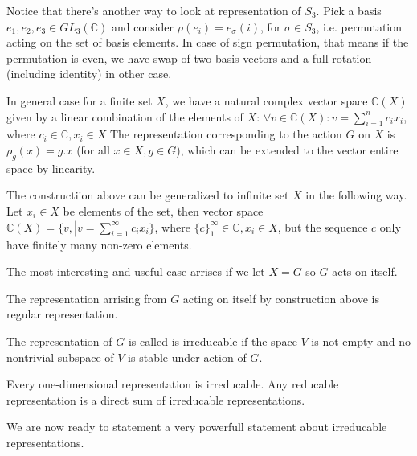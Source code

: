 \documentclass{amsart}
\begin{document}
Notice that there's another way to look at representation of $S_3$. Pick a basis $e_1, e_2, e_3 \in GL_3 (\mathbb C)$ and consider $\rho (e_i) = e_\sigma(i)$, for $\sigma \in S_3$, i.e. permutation acting on the set of basis elements. In case of sign permutation, that means 
if the permutation is even, we have swap of two basis vectors and a full rotation (including identity) in other case.

In general case for a finite set $X$, we have a natural complex vector space $\mathbb{C}(X)$ given by a linear combination of the elements of $X$:
$\forall v \in \mathbb{C}(X): v = \sum_{i=1}^n c_i x_i$, where $c_i \in \mathbb{C}, x_i \in X$
The representation corresponding to the action $G$ on $X$ is $\rho_g (x) = g . x$ (for all $x\in X, g \in G$), which can be extended to the vector entire space by linearity.

\begin{note}
    The constructiion above can be generalized to infinite set $X$ in the following way.
    Let $x_i \in X$ be elements of the set, 
    then vector space $\mathbb{C}(X)=\{ v, \left. \right| v = \sum_{i=1}^\infty c_i x_i\}$, where $ \{c\}_1^\infty \in \mathbb{C}, x_i \in X$, 
    but the sequence $c$ only have finitely many non-zero elements.
\end{note}

The most interesting and useful case arrises if we let $X = G$ so $G$ acts on itself.

\begin{definition}
The representation arrising from $G$ acting on itself by construction above is regular representation.
\end{definition}

\begin{definition}

The representation of $G$ is called is irreducable if the space $V$ is not empty and no nontrivial subspace of $V$ is stable under action of $G$.
    
\end{definition}

\begin{lemma}
    Every one-dimensional representation is irreducable. Any reducable representation is a direct sum of irreducable representations.
\end{lemma}


We are now ready to statement a very powerfull statement about irreducable representations.
\end{document}
